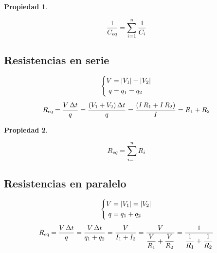 \documentclass[a5paper,12pt,twoside]{book}
\newtheorem{prop}{{Propiedad}}[chapter]
\begin{document}
\begin{mdframed}[style=MyFrame1]
    \begin{prop}
    \end{prop}
    \begin{equation*}
        \frac{1}{{{C}_\textsl{{eq}}}} = \sum_{i=1}^n \frac{1}{C_i}
    \end{equation*}
\end{mdframed}


\subsection{Resistencias en serie}

\begin{gather*}
    \left\{
    \begin{aligned}
        V &= {\left| {V_1} \right|} + {\left| {V_2} \right|}
        \\
        q &= q_1 = q_2
    \end{aligned}
    \right.
    \\[1ex]
    {{R}_\textsl{{eq}}} = \frac{V \, \Delta t}{q} = \frac{\left(V_1 + V_2\right) \Delta t}{q} = \frac{\left(I \, R_1 + I \, R_2\right)}{I} = R_1 + R_2
\end{gather*}

\begin{mdframed}[style=MyFrame1]
    \begin{prop}
    \end{prop}
    \begin{equation*}
        {{R}_\textsl{{eq}}} = \sum_{i=1}^n R_i
    \end{equation*}
\end{mdframed}


\subsection{Resistencias en paralelo}

\begin{gather*}
    \left\{
    \begin{aligned}
        V &= {\left| {V_1} \right|} = {\left| {V_2} \right|}
        \\
        q &= q_1 + q_2
    \end{aligned}
    \right.
    \\[1ex]
    {{R}_\textsl{{eq}}} = \frac{V \, \Delta t}{q}
    = \frac{V \, \Delta t}{q_1 + q_2}
    = \frac{V}{I_1 + I_2} = \frac{V}{\dfrac{V}{R_1} + \dfrac{V}{R_2}}
    = \frac{1}{\dfrac{1}{R_1}+\dfrac{1}{R_2}}
\end{gather*}
\end{document}
